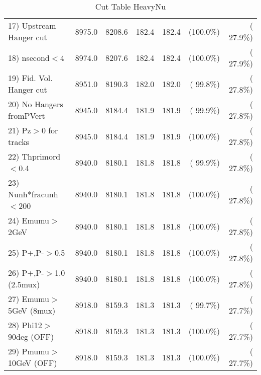 \begin{table}[h!]
\begin{tabular}{||l||r|r|r|r|r|r||}
 17) Upstream Hanger cut  &       8975.0 &       8208.6 &        182.4 &        182.4 & (100.0\%) & ( 27.9\%) \\
 18) nsecond$<$4          &       8974.0 &       8207.6 &        182.4 &        182.4 & (100.0\%) & ( 27.9\%) \\
 19) Fid. Vol. Hanger cut &       8951.0 &       8190.3 &        182.0 &        182.0 & ( 99.8\%) & ( 27.8\%) \\
 20) No Hangers fromPVert &       8945.0 &       8184.4 &        181.9 &        181.9 & ( 99.9\%) & ( 27.8\%) \\
 21) Pz$>$0 for tracks    &       8945.0 &       8184.4 &        181.9 &        181.9 & (100.0\%) & ( 27.8\%) \\
 22) Thprimord$<$0.4      &       8940.0 &       8180.1 &        181.8 &        181.8 & ( 99.9\%) & ( 27.8\%) \\
 23) Nunh*fracunh$<$200   &       8940.0 &       8180.1 &        181.8 &        181.8 & (100.0\%) & ( 27.8\%) \\
 24) Emumu$>$2GeV         &       8940.0 &       8180.1 &        181.8 &        181.8 & (100.0\%) & ( 27.8\%) \\
 25) P+,P-$>$0.5          &       8940.0 &       8180.1 &        181.8 &        181.8 & (100.0\%) & ( 27.8\%) \\
 26) P+,P-$>$1.0 (2.5mux) &       8940.0 &       8180.1 &        181.8 &        181.8 & (100.0\%) & ( 27.8\%) \\
 27) Emumu$>$5GeV  (8mux) &       8918.0 &       8159.3 &        181.3 &        181.3 & ( 99.7\%) & ( 27.7\%) \\
 28) Phi12$>$90deg  (OFF) &       8918.0 &       8159.3 &        181.3 &        181.3 & (100.0\%) & ( 27.7\%) \\
 29) Pmumu$>$10GeV  (OFF) &       8918.0 &       8159.3 &        181.3 &        181.3 & (100.0\%) & ( 27.7\%) \\
 \hline
 \hline
 \end{tabular}
 \caption{Cut Table  HeavyNu  }
 \label{tab-cutheavy_neutrino}
 \end{table}
